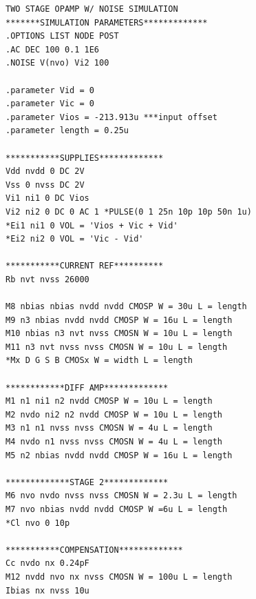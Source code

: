 \documentclass[12pt]{article}
\begin{document}
\begin{lstlisting}
TWO STAGE OPAMP W/ NOISE SIMULATION
*******SIMULATION PARAMETERS*************
.OPTIONS LIST NODE POST
.AC DEC 100 0.1 1E6
.NOISE V(nvo) Vi2 100

.parameter Vid = 0
.parameter Vic = 0
.parameter Vios = -213.913u ***input offset
.parameter length = 0.25u

***********SUPPLIES*************
Vdd nvdd 0 DC 2V
Vss 0 nvss DC 2V
Vi1 ni1 0 DC Vios
Vi2 ni2 0 DC 0 AC 1 *PULSE(0 1 25n 10p 10p 50n 1u)
*Ei1 ni1 0 VOL = 'Vios + Vic + Vid'
*Ei2 ni2 0 VOL = 'Vic - Vid'

***********CURRENT REF**********
Rb nvt nvss 26000

M8 nbias nbias nvdd nvdd CMOSP W = 30u L = length
M9 n3 nbias nvdd nvdd CMOSP W = 16u L = length
M10 nbias n3 nvt nvss CMOSN W = 10u L = length
M11 n3 nvt nvss nvss CMOSN W = 10u L = length
*Mx D G S B CMOSx W = width L = length

************DIFF AMP*************
M1 n1 ni1 n2 nvdd CMOSP W = 10u L = length
M2 nvdo ni2 n2 nvdd CMOSP W = 10u L = length 
M3 n1 n1 nvss nvss CMOSN W = 4u L = length
M4 nvdo n1 nvss nvss CMOSN W = 4u L = length
M5 n2 nbias nvdd nvdd CMOSP W = 16u L = length

*************STAGE 2*************
M6 nvo nvdo nvss nvss CMOSN W = 2.3u L = length
M7 nvo nbias nvdd nvdd CMOSP W =6u L = length
*Cl nvo 0 10p

***********COMPENSATION*************
Cc nvdo nx 0.24pF
M12 nvdd nvo nx nvss CMOSN W = 100u L = length
Ibias nx nvss 10u


\end{lstlisting}
\end{document}
